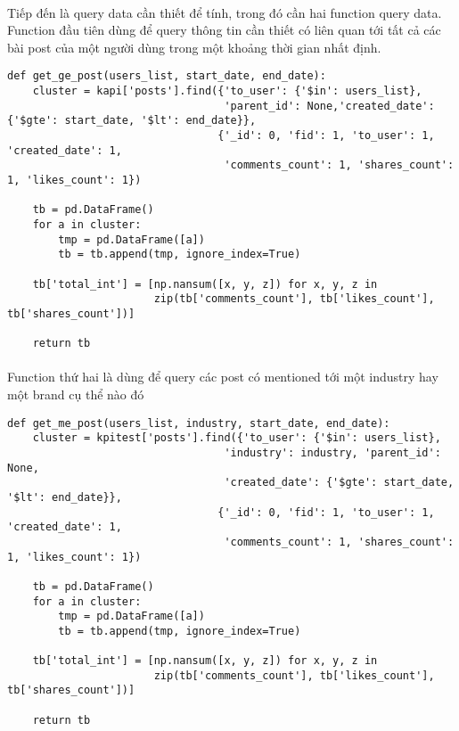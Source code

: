 \documentclass[12pt]{article}
\numberwithin{equation}{section}
\begin{document}
\paragraph{} Tiếp đến là query data cần thiết để tính, trong đó cần hai function query data. Function đầu tiên dùng để query thông tin cần thiết có liên quan tới tất cả các bài post của một người dùng trong một khoảng thời gian nhất định.

\begin{lstlisting}
def get_ge_post(users_list, start_date, end_date):
    cluster = kapi['posts'].find({'to_user': {'$in': users_list},
                                  'parent_id': None,'created_date': {'$gte': start_date, '$lt': end_date}},
                                 {'_id': 0, 'fid': 1, 'to_user': 1, 'created_date': 1,
                                  'comments_count': 1, 'shares_count': 1, 'likes_count': 1})
                                  
    tb = pd.DataFrame()
    for a in cluster:
        tmp = pd.DataFrame([a])
        tb = tb.append(tmp, ignore_index=True)

    tb['total_int'] = [np.nansum([x, y, z]) for x, y, z in
                       zip(tb['comments_count'], tb['likes_count'], tb['shares_count'])]

    return tb
\end{lstlisting}

\paragraph{} Function thứ hai là dùng để query các post có mentioned tới một industry hay một brand cụ thể nào đó

\begin{lstlisting}
def get_me_post(users_list, industry, start_date, end_date):
    cluster = kpitest['posts'].find({'to_user': {'$in': users_list},
                                  'industry': industry, 'parent_id': None,
                                  'created_date': {'$gte': start_date, '$lt': end_date}},
                                 {'_id': 0, 'fid': 1, 'to_user': 1, 'created_date': 1,
                                  'comments_count': 1, 'shares_count': 1, 'likes_count': 1})

    tb = pd.DataFrame()
    for a in cluster:
        tmp = pd.DataFrame([a])
        tb = tb.append(tmp, ignore_index=True)

    tb['total_int'] = [np.nansum([x, y, z]) for x, y, z in
                       zip(tb['comments_count'], tb['likes_count'], tb['shares_count'])]

    return tb
\end{lstlisting}
\end{document}
